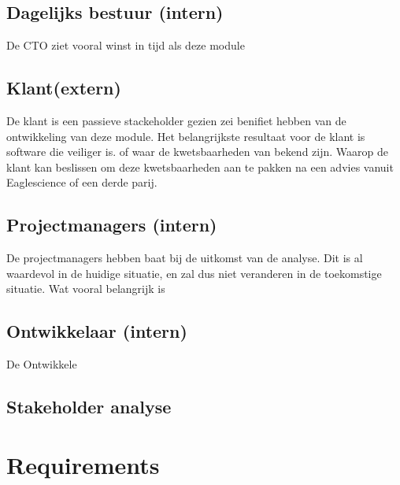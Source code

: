 \subsection{Dagelijks bestuur (intern) }
De CTO ziet vooral winst in tijd als deze module
\subsection{Klant(extern)}
De klant is een passieve stackeholder gezien zei benifiet hebben van de ontwikkeling van deze module. Het belangrijkste resultaat voor de klant is software die veiliger is. of waar de kwetsbaarheden van bekend zijn. Waarop de klant kan beslissen om deze kwetsbaarheden aan te pakken na een advies vanuit Eaglescience of een derde parij.

\subsection{Projectmanagers (intern)}
De projectmanagers hebben baat bij de uitkomst van de analyse. Dit is al waardevol in de huidige situatie, en zal dus niet veranderen in de toekomstige situatie. Wat vooral belangrijk is
\subsection{Ontwikkelaar (intern)}
De Ontwikkele
\subsection{Stakeholder analyse}
\section{Requirements}
